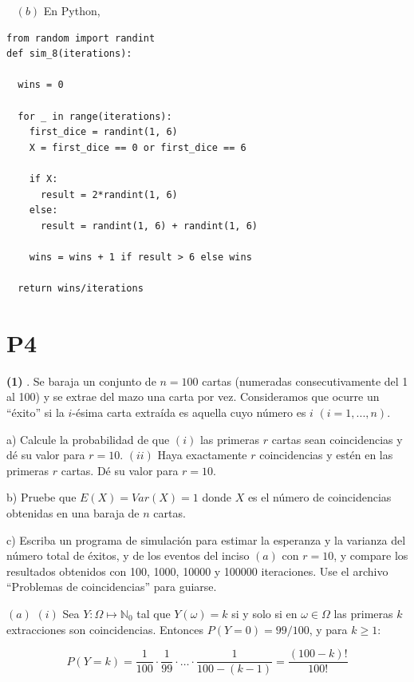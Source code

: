 \documentclass[a4paper, 12pt]{article}
\begin{document}
~ 
$(b)$ En Python,

\begin{verbatim}
from random import randint
def sim_8(iterations):

  wins = 0

  for _ in range(iterations):
    first_dice = randint(1, 6)
    X = first_dice == 0 or first_dice == 6
  
    if X:
      result = 2*randint(1, 6)
    else:
      result = randint(1, 6) + randint(1, 6)

    wins = wins + 1 if result > 6 else wins

  return wins/iterations
\end{verbatim}

\pagebreak 

\section{P4}



\begin{myframe}
  \textbf{(1)} . Se baraja un conjunto de $n = 100$ cartas (numeradas
  consecutivamente del 1 al 100) y se extrae del mazo una carta por vez.
  Consideramos que ocurre un “éxito” si la $i$-ésima carta extraída es aquella
  cuyo número es $i$ $(i = 1,...,n)$. 

  a) Calcule la probabilidad de que $(i)$ las
  primeras $r$ cartas sean coincidencias y dé su valor para $r = 10$. $(ii)$ Haya
  exactamente $r$ coincidencias y estén en las primeras $r$ cartas. Dé su valor para
  $r = 10$. 

  b) Pruebe que $E(X) = Var(X) = 1$ donde $X$ es el número de coincidencias
  obtenidas en una baraja de $n$ cartas. 

  c) Escriba un programa de simulación para
  estimar la esperanza y la varianza del número total de éxitos, y de los
  eventos del inciso $(a)$ con $r = 10$, y compare los resultados obtenidos con 100,
  1000, 10000 y 100000 iteraciones. Use el archivo “Problemas de coincidencias”
  para guiarse.
\end{myframe}


$(a)$ $(i)$ Sea $Y : \Omega \mapsto \mathbb{N}_0$ tal que $Y(\omega) = k$ si y solo si en
$\omega \in \Omega$ las primeras $k$ extracciones son coincidencias. Entonces
$P(Y = 0) = 99 / 100$, y para $k \geq 1$:

\begin{equation*}
  P(Y = k) = \frac{1}{100} \cdot \frac{1}{99} \cdot \ldots \cdot \frac{1}{100
  - (k-1)} = \frac{(100 - k)!}{100!}
\end{equation*}
\end{document}
